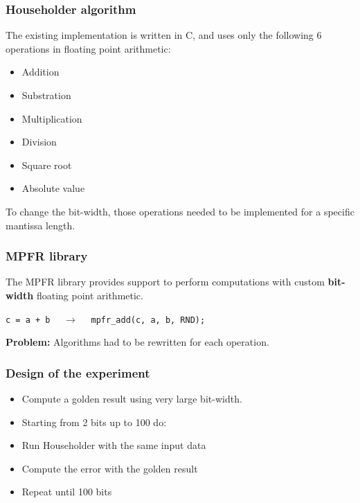 \documentclass[serif, 12pt]{beamer}
\begin{document}
\begin{frame}
\frametitle{Householder algorithm}

The existing implementation is written in C, and uses only the following 6 
operations in floating point arithmetic:

\begin{itemize}
\item Addition
\item Substration
\item Multiplication
\item Division
\item Square root
\item Absolute value
\end{itemize}

\pause

To change the bit-width, those operations needed to be implemented for a 
specific mantissa length.

\end{frame}


\begin{frame}
\frametitle{MPFR library}
The MPFR library provides support to perform computations with custom 
\textbf{bit-width} floating point arithmetic.

\vspace{1em}

\texttt{c = a + b} $\quad \rightarrow \quad$ \texttt{mpfr\_add(c, a, b, RND);}

\vspace{1em}
\pause
\textbf{Problem:} Algorithms had to be rewritten for each operation.
\end{frame}


\begin{frame}
\frametitle{Design of the experiment}

\begin{itemize}
\item Compute a golden result using very large bit-width.
\item Starting from 2 bits up to 100 do:
\item Run Householder with the same input data
\item Compute the error with the golden result
\item Repeat until 100 bits
\end{itemize}

\end{frame}
\end{document}
